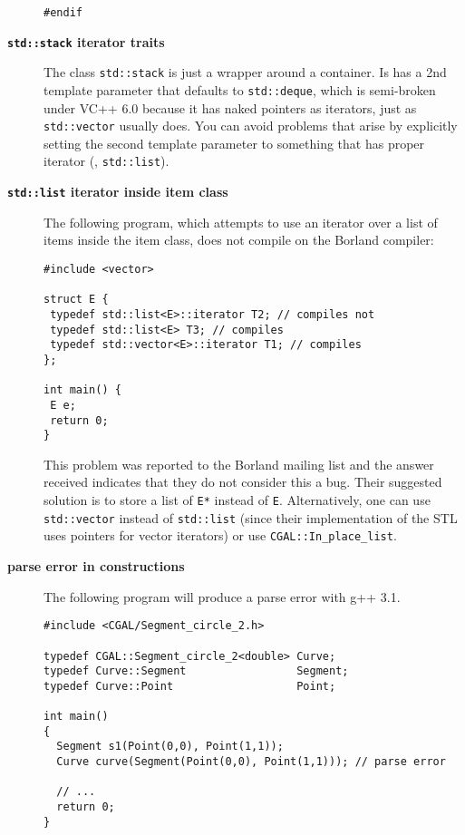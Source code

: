 \begin{description}
\begin{verbatim}
#endif
\end{verbatim}

\item[\textbf{{\tt std::stack} iterator traits}]
The class \texttt{std::stack} is just a wrapper around a container.
Is has a 2nd template parameter that defaults to \texttt{std::deque},
which is semi-broken under VC++ 6.0 because it has naked pointers as 
iterators, just as \texttt{std::vector} usually does.  You can avoid
problems that arise by explicitly setting the second template parameter
to something that has proper iterator (\eg, \texttt{std::list}).

\item[\textbf{{\tt std::list} iterator inside item class}]

The following program, which attempts to use an iterator over a list of
items inside the item class, does not compile on the Borland compiler:

\begin{verbatim}
#include <vector>

struct E {
 typedef std::list<E>::iterator T2; // compiles not
 typedef std::list<E> T3; // compiles
 typedef std::vector<E>::iterator T1; // compiles
};

int main() {
 E e;
 return 0;
}
\end{verbatim}

This problem was reported to the Borland mailing list and the answer received
indicates that they do not consider this a bug.  Their suggested solution
is to store a list of \texttt{E*} instead of \texttt{E}. Alternatively, one
can use \texttt{std::vector} instead of \texttt{std::list} (since their
implementation of the STL uses pointers for vector iterators) or use 
\texttt{CGAL::In\_place\_list}.

\item[\textbf{parse error in constructions}]
The following program will produce a parse error with g++ 3.1.

\begin{verbatim}
#include <CGAL/Segment_circle_2.h> 

typedef CGAL::Segment_circle_2<double> Curve; 
typedef Curve::Segment                 Segment; 
typedef Curve::Point                   Point; 

int main()
{
  Segment s1(Point(0,0), Point(1,1));
  Curve curve(Segment(Point(0,0), Point(1,1))); // parse error
  
  // ...
  return 0;
}
\end{verbatim}


\end{description}
